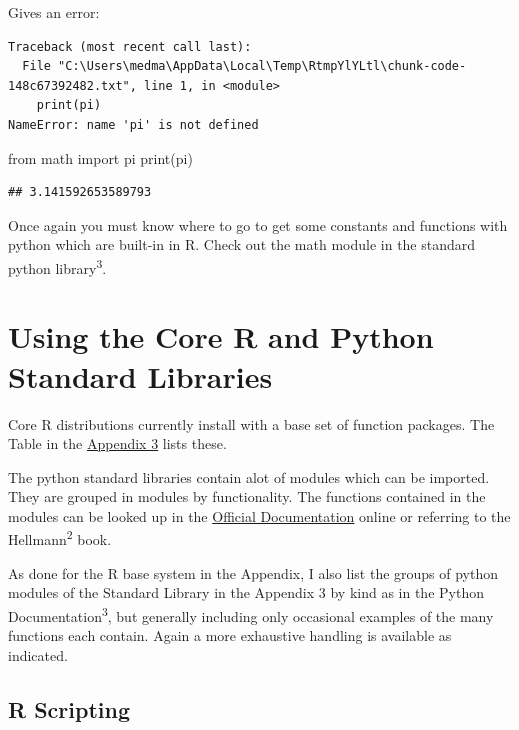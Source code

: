 \documentclass[]{book}
\newenvironment{Shaded}{\begin{snugshade}}{\end{snugshade}}
\newcommand{\ImportTok}[1]{#1}
\newcommand{\BuiltInTok}[1]{#1}
\newcommand{\NormalTok}[1]{#1}
\theoremstyle{definition}
\theoremstyle{definition}
\theoremstyle{definition}
\theoremstyle{remark}
\begin{document}
Gives an error:

\begin{verbatim}
Traceback (most recent call last):
  File "C:\Users\medma\AppData\Local\Temp\RtmpYlYLtl\chunk-code-148c67392482.txt", line 1, in <module>
    print(pi)
NameError: name 'pi' is not defined
\end{verbatim}

\begin{Shaded}
\begin{Highlighting}[]
\ImportTok{from}\NormalTok{ math }\ImportTok{import}\NormalTok{ pi}
\BuiltInTok{print}\NormalTok{(pi)}
\end{Highlighting}
\end{Shaded}

\begin{verbatim}
## 3.141592653589793
\end{verbatim}

Once again you must know where to go to get some constants and functions
with python which are built-in in R. Check out the math module in the
standard python library\textsuperscript{3}.

\section{Using the Core R and Python Standard
Libraries}\label{using-the-core-r-and-python-standard-libraries}

Core R distributions currently install with a base set of function
packages. The Table in the \href{17-Appendix_3_Packages.Rmd}{Appendix 3}
lists these.

The python standard libraries contain alot of modules which can be
imported. They are grouped in modules by functionality. The functions
contained in the modules can be looked up in the
\href{https://docs.python.org/3.7/}{Official Documentation} online or
referring to the Hellmann\textsuperscript{2} book.

As done for the R base system in the Appendix, I also list the groups of
python modules of the Standard Library in the Appendix 3 by kind as in
the Python Documentation\textsuperscript{3}, but generally including
only occasional examples of the many functions each contain. Again a
more exhaustive handling is available as indicated.

\subsection{R Scripting}\label{r-scripting-3}
\end{document}
